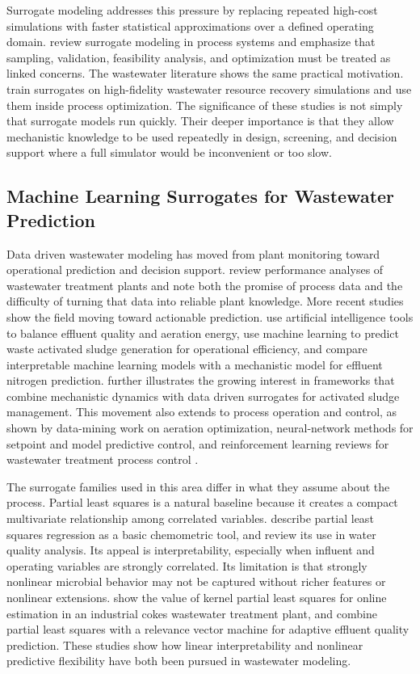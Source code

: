 \documentclass[12pt, twoside]{book}
\begin{document}
Surrogate modeling addresses this pressure by replacing repeated high-cost simulations with faster statistical
approximations over a defined operating domain. \citet{BhosekarIerapetritou2018} review surrogate modeling in
process systems and emphasize that sampling, validation, feasibility analysis, and optimization must be treated
as linked concerns. The wastewater literature shows the same practical motivation. \citet{Durkin2024} train
surrogates on high-fidelity wastewater resource recovery simulations and use them inside process optimization.
The significance of these studies is not simply that surrogate models run quickly. Their deeper importance is
that they allow mechanistic knowledge to be used repeatedly in design, screening, and decision support where a
full simulator would be inconvenient or too slow.

\subsection{Machine Learning Surrogates for Wastewater Prediction}

Data driven wastewater modeling has moved from plant monitoring toward operational prediction and decision
support. \citet{Newhart2019} review performance analyses of wastewater treatment plants and note both the
promise of process data and the difficulty of turning that data into reliable plant knowledge. More recent
studies show the field moving toward actionable prediction. \citet{Mao2024} use artificial intelligence tools
to balance effluent quality and aeration energy, \citet{Yang2025} use machine learning to predict waste
activated sludge generation for operational efficiency, and \citet{Wang2025} compare interpretable machine
learning models with a mechanistic model for effluent nitrogen prediction. \citet{Xiao2026} further illustrates
the growing interest in frameworks that combine mechanistic dynamics with data driven surrogates for activated
sludge management. This movement also extends to process operation and control, as shown by data-mining work
on aeration optimization, neural-network methods for setpoint and model predictive control, and reinforcement
learning reviews for wastewater treatment process control \citep{Asadi2017,Sadeghassadi2018,Croll2023}.

The surrogate families used in this area differ in what they assume about the process. Partial least squares is
a natural baseline because it creates a compact multivariate relationship among correlated variables.
\citet{Wold2001} describe partial least squares regression as a basic chemometric tool, and \citet{Khatri2020}
review its use in water quality analysis. Its appeal is interpretability, especially when influent and
operating variables are strongly correlated. Its limitation is that strongly nonlinear microbial behavior may
not be captured without richer features or nonlinear extensions. \citet{Woo2009} show the value of kernel
partial least squares for online estimation in an industrial cokes wastewater treatment plant, and
\citet{Yang2021} combine partial least squares with a relevance vector machine for adaptive effluent quality
prediction. These studies show how linear interpretability and nonlinear predictive flexibility have both
been pursued in wastewater modeling.
\end{document}
